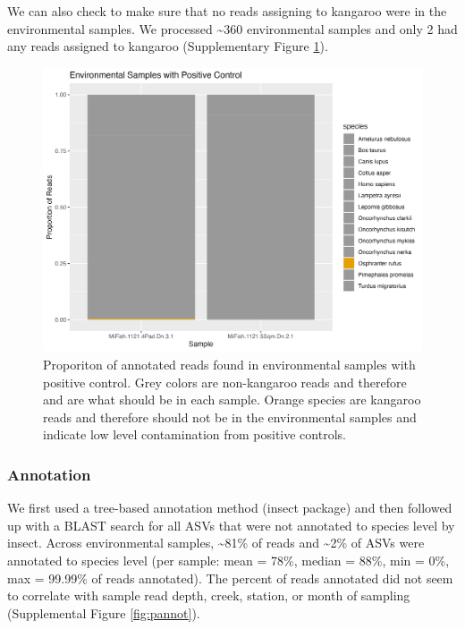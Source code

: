 \documentclass[
]{article}
\begin{document}
We can also check to make sure that no reads assigning to kangaroo were
in the environmental samples. We processed \textasciitilde360
environmental samples and only 2 had any reads assigned to kangaroo
(Supplementary Figure \ref{fig:controls2}).

\begin{figure}
\centering
\includegraphics{../Output/SupplementalFigures/check_controls2.png}
\caption{Proporiton of annotated reads found in environmental samples
with positive control. Grey colors are non-kangaroo reads and therefore
and are what should be in each sample. Orange species are kangaroo reads
and therefore should not be in the environmental samples and indicate
low level contamination from positive controls.\label{fig:controls2}}
\end{figure}

\hypertarget{annotation}{%
\subsubsection{Annotation}\label{annotation}}

We first used a tree-based annotation method (insect package) and then
followed up with a BLAST search for all ASVs that were not annotated to
species level by insect. Across environmental samples,
\textasciitilde81\% of reads and \textasciitilde2\% of ASVs were
annotated to species level (per sample: mean = 78\%, median = 88\%, min
= 0\%, max = 99.99\% of reads annotated). The percent of reads annotated
did not seem to correlate with sample read depth, creek, station, or
month of sampling (Supplemental Figure \ref{fig:pannot}).
\end{document}
